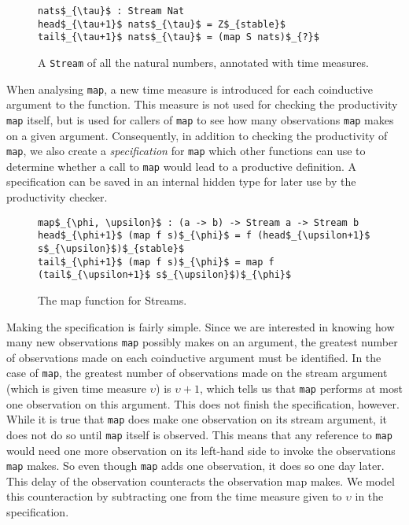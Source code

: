 \begin{figure}
\begin{Verbatim}[commandchars=\\\{\},codes={\catcode`$=3\catcode`_=8}]
nats$_{\tau}$ : Stream Nat
head$_{\tau+1}$ nats$_{\tau}$ = Z$_{stable}$
tail$_{\tau+1}$ nats$_{\tau}$ = (map S nats)$_{?}$
\end{Verbatim}
\caption{A \texttt{Stream} of all the natural numbers, annotated with time measures.}
\label{fig:nats_productivity}
\end{figure}

When analysing \texttt{map}, a new time measure is introduced for each coinductive argument to the function. This measure is not used for checking the productivity \texttt{map} itself, but is used for callers of \texttt{map} to see how many observations \texttt{map} makes on a given argument. Consequently, in addition to checking the productivity of \texttt{map}, we also create a \textit{specification} for \texttt{map} which other functions can use to determine whether a call to \texttt{map} would lead to a productive definition. A specification can be saved in an internal hidden type for later use by the productivity checker.

\begin{figure}
\begin{Verbatim}[commandchars=\\\{\},codes={\catcode`$=3\catcode`_=8}]
map$_{\phi, \upsilon}$ : (a -> b) -> Stream a -> Stream b
head$_{\phi+1}$ (map f s)$_{\phi}$ = f (head$_{\upsilon+1}$ s$_{\upsilon}$)$_{stable}$
tail$_{\phi+1}$ (map f s)$_{\phi}$ = map f (tail$_{\upsilon+1}$ s$_{\upsilon}$)$_{\phi}$
\end{Verbatim}
\caption{The map function for Streams.}
\label{fig:map}
\end{figure}

Making the specification is fairly simple. Since we are interested in knowing how many new observations \texttt{map} possibly makes on an argument, the greatest number of observations made on each coinductive argument must be identified. In the case of \texttt{map}, the greatest number of observations made on the stream argument (which is given time measure $\upsilon$) is $\upsilon+1$, which tells us that \texttt{map} performs at most one observation on this argument. This does not finish the specification, however. While it is true that \texttt{map} does make one observation on its stream argument, it does not do so until \texttt{map} itself is observed. This means that any reference to \texttt{map} would need one more observation on its left-hand side to invoke the observations \texttt{map} makes. So even though \texttt{map} adds one observation, it does so one day later. This delay of the observation counteracts the observation map makes. We model this counteraction by subtracting one from the time measure given to $\upsilon$ in the specification.

